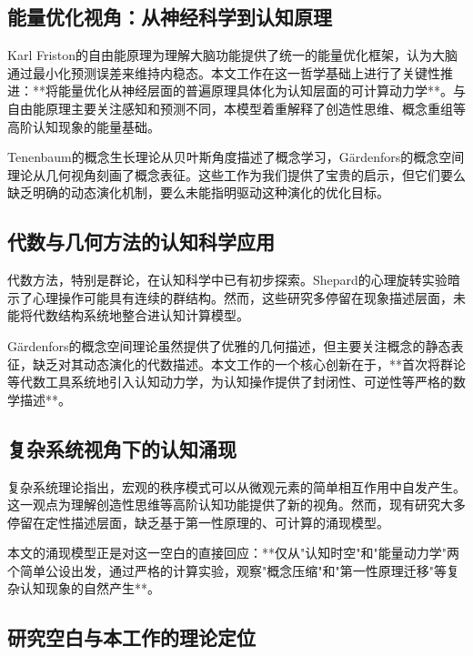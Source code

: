 \documentclass[12pt,a4paper]{article}
\begin{document}
\subsection{能量优化视角：从神经科学到认知原理}

Karl Friston的自由能原理\cite{friston2010free}为理解大脑功能提供了统一的能量优化框架，认为大脑通过最小化预测误差来维持内稳态。本文工作在这一哲学基础上进行了关键性推进：**将能量优化从神经层面的普遍原理具体化为认知层面的可计算动力学**。与自由能原理主要关注感知和预测不同，本模型着重解释了创造性思维、概念重组等高阶认知现象的能量基础。

Tenenbaum的概念生长理论\cite{tenenbaum2011grow}从贝叶斯角度描述了概念学习，Gärdenfors的概念空间理论\cite{gardenfors2004conceptual}从几何视角刻画了概念表征。这些工作为我们提供了宝贵的启示，但它们要么缺乏明确的动态演化机制，要么未能指明驱动这种演化的优化目标。

\subsection{代数与几何方法的认知科学应用}

代数方法，特别是群论\cite{rotman1995theory}，在认知科学中已有初步探索。Shepard的心理旋转实验暗示了心理操作可能具有连续的群结构。然而，这些研究多停留在现象描述层面，未能将代数结构系统地整合进认知计算模型。

Gärdenfors的概念空间理论虽然提供了优雅的几何描述，但主要关注概念的静态表征，缺乏对其动态演化的代数描述。本文工作的一个核心创新在于，**首次将群论等代数工具系统地引入认知动力学，为认知操作提供了封闭性、可逆性等严格的数学描述**。

\subsection{复杂系统视角下的认知涌现}

复杂系统理论指出，宏观的秩序模式可以从微观元素的简单相互作用中自发产生。这一观点为理解创造性思维等高阶认知功能提供了新的视角。然而，现有研究大多停留在定性描述层面，缺乏基于第一性原理的、可计算的涌现模型。

本文的涌现模型正是对这一空白的直接回应：**仅从"认知时空"和"能量动力学"两个简单公设出发，通过严格的计算实验，观察"概念压缩"和"第一性原理迁移"等复杂认知现象的自然产生**。

\subsection{研究空白与本工作的理论定位}
\end{document}
